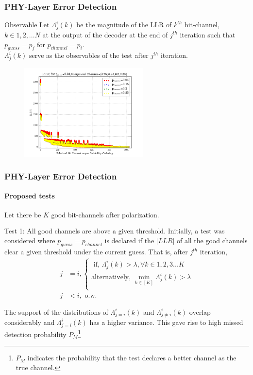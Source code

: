 \documentclass[xcolor=dvipsnames]{beamer}
\begin{document}
\begin{frame}[label=obs]
\frametitle{PHY-Layer Error Detection}
\begin{block}{Observable}
Let $\Lambda_j^i(k)$ be the magnitude of the LLR of $k^{th}$ bit-channel, $k\in{1,2,...N}$ at the output of the decoder at the end of $j^{th}$ iteration such that $p_{guess}=p_j$ for $p_{channel}=p_i$.\\ $\Lambda_j^i(k)$ serve as the observables of the test after $j^{th}$ iteration.
\end{block}
\begin{figure}[h]
 \begin{center}
    \includegraphics[width=6.5cm]{absllr0p04.png}
  \end{center}
  \label{fig:iswrpc}
\end{figure}
\end{frame}
\begin{frame}[label=test1]
\frametitle{PHY-Layer Error Detection}
\framesubtitle{Proposed tests}
Let there be $K$ good bit-channels after polarization.  
\begin{block}{Test 1: All good channels are above a given threshold.}
Initially, a test was considered where $p_{guess}=p_{channel}$ is declared if the $|LLR|$ of all the good channels clear a given threshold under the current guess. That is, after $j^{th}$ iteration,
\begin{align*}  
j & =i, 
\begin{cases}
\text{   if, }  \Lambda_{j}^i(k) > \lambda, \forall k \in {1,2,3...K}\\
\text{alternatively, } \displaystyle\min_{k \in [K]}\Lambda_{j}^i(k) > \lambda  \\
\end{cases}\\
 j & < i,  \text{ o.w.}
\end{align*} 
\end{block}
\small
The support of the distributions of $\Lambda_{j=i}^i(k)$ and $\Lambda_{j \neq i}^i(k)$ overlap considerably and $\Lambda_{j=i}^i(k)$ has a higher variance.
This gave rise to high missed detection probability $P_M$\footnote{\tiny $P_M$ indicates the probability that the test declares a better channel as the true channel.}
\end{frame}
\end{document}
